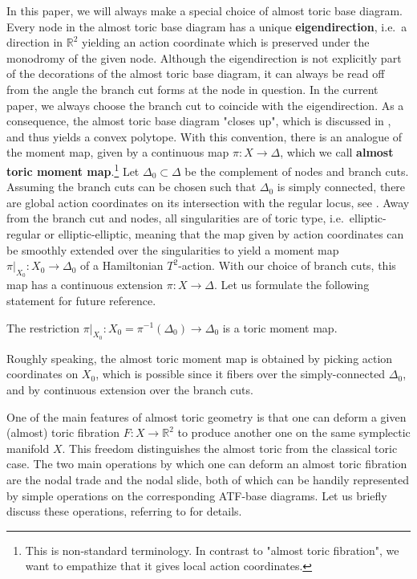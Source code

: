 \documentclass[12pt,a4paper,abstract=true,final]{scrartcl}
\begin{document}
In this paper, we will always make a special choice of almost toric base diagram.
Every node in the almost toric base diagram has a unique \textbf{eigendirection}, i.e.\ a direction in $\mathbb{R}^2$ yielding an action coordinate which is preserved under the monodromy of the given node.
Although the eigendirection is not explicitly part of the decorations of the almost toric base diagram, it can always be read off from the angle the branch cut forms at the node in question.
In the current paper, we always choose the branch cut to coincide with the eigendirection.
As a consequence, the almost toric base diagram "closes up", which is discussed in \cite[Section 7.2]{evans2021atfs}, and thus yields a convex polytope.
With this convention, there is an analogue of the moment map, given by a continuous map $\pi \colon X \rightarrow \Delta$, which we call \textbf{almost toric moment map}.\footnote{This is non-standard terminology. In contrast to "almost toric fibration", we want to empathize that it gives local action coordinates.}
Let $\Delta_0 \subset \Delta$ be the complement of nodes and branch cuts.
Assuming the branch cuts can be chosen such that $\Delta_0$ is simply connected, there are global action coordinates on its intersection with the regular locus, see \cite{Dui80}.
Away from the branch cut and nodes, all singularities are of toric type, i.e.\ elliptic-regular or elliptic-elliptic, meaning that the map given by action coordinates can be smoothly extended over the singularities to yield a moment map $\pi\vert_{X_0} \colon X_0 \rightarrow \Delta_0$ of a Hamiltonian $T^2$-action.
With our choice of branch cuts, this map has a continuous extension $\pi \colon X \rightarrow \Delta$.
Let us formulate the following statement for future reference.

\begin{proposition}
    \label{thm:toricmomentmap}
    The restriction $\pi\vert_{X_0} \colon X_0 = \pi^{-1}(\Delta_0) \rightarrow \Delta_0$ is a toric moment map.
\end{proposition}

Roughly speaking, the almost toric moment map is obtained by picking action coordinates on $X_0$, which is possible since it fibers over the simply-connected $\Delta_0$, and by continuous extension over the branch cuts.

One of the main features of almost toric geometry is that one can deform a given (almost) toric fibration $F \colon X \rightarrow \mathbb{R}^2$ to produce another one on the same symplectic manifold $X$.
This freedom distinguishes the almost toric from the classical toric case.
The two main operations by which one can deform an almost toric fibration are the nodal trade and the nodal slide, both of which can be handily represented by simple operations on the corresponding ATF-base diagrams.
Let us briefly discuss these operations, referring to \cite[Sections 8.2-8.3]{evans2021atfs} for details.
\end{document}
